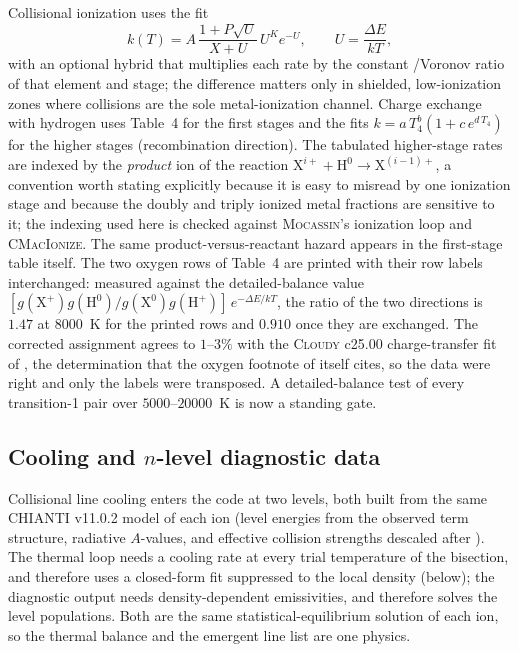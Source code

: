 \documentclass[twocolumn,linenumbers]{aastex702}
\begin{document}
Collisional ionization uses the \citet{voronov1997} fit
\begin{equation}
  k(T) = A\,\frac{1 + P\sqrt{U}}{X + U}\,U^{K} e^{-U},
  \qquad U = \frac{\Delta E}{kT},
\end{equation}%
with an optional hybrid that multiplies each rate by the constant
\citet{dere2007}/Voronov ratio of that element and stage; the difference matters
only in shielded, low-ionization zones where collisions are the sole
metal-ionization channel.  Charge exchange with hydrogen uses
\citet{huang2023} Table~4 for the first stages and the
\citet{kingdon1996} fits $k = a\,T_4^{b}(1 + c\,e^{d\,T_4})$ for the higher
stages (recombination direction).  The tabulated higher-stage rates are
indexed by the \emph{product} ion of the reaction
$\mathrm{X}^{i+} + \mathrm{H}^{0} \to \mathrm{X}^{(i-1)+}$, a convention worth
stating explicitly because it is easy to misread by one ionization stage and
because the doubly and triply ionized metal fractions are sensitive to it;
the indexing used here is checked against \textsc{Mocassin}'s ionization loop
and \textsc{CMacIonize}.  The same product-versus-reactant hazard appears in
the first-stage table itself.  The two oxygen rows of \citet{huang2023}
Table~4 are printed with their row labels interchanged: measured against the
detailed-balance value
$[g(\mathrm{X}^{+})g(\mathrm{H}^{0})/g(\mathrm{X}^{0})g(\mathrm{H}^{+})]\,
e^{-\Delta E/kT}$, the ratio of the two directions is $1.47$ at $8000$~K for
the printed rows and $0.910$ once they are exchanged.  The corrected
assignment agrees to $1$--$3\%$ with the \textsc{Cloudy} c25.00
charge-transfer fit of \citet{stancil1999}, the determination that the oxygen
footnote of \citet{huang2023} itself cites, so the data were right and only
the labels were transposed.  A detailed-balance test of every transition-1
pair over $5000$--$20000$~K is now a standing gate.

\subsection{Cooling and $n$-level diagnostic data}
\label{sec:cooldata}

Collisional line cooling enters the code at two levels, both built from the
same CHIANTI v11.0.2 model of each ion (level energies from the observed
term structure, radiative $A$-values, and effective collision strengths
descaled after \citealt{burgess1992}).  The thermal loop needs a cooling
rate at every trial temperature of the bisection, and therefore uses a
closed-form fit suppressed to the local density (below); the diagnostic
output needs density-dependent emissivities, and therefore solves the level
populations.  Both are the same statistical-equilibrium solution of each
ion, so the thermal balance and the emergent line list are one physics.
\end{document}
